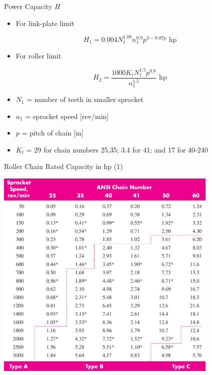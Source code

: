 \documentclass[10pt, svgnames]{beamer}
\begin{document}
\begin{frame}[label={sec:org4d8bb80}]{Power Capacity \(H\)}
\begin{itemize}
\item For link-plate limit
\end{itemize}

$$ H_1 = 0.004 N_1^{1.08} n_1^{0.9} p^{3-0.07p} \text{ hp} $$

\begin{itemize}
\item For roller limit
\end{itemize}

$$ H_2 = \frac{1000 K_t N_1^{1.5} p^{0.8}}{n_1^{1.5}} \text{ hp}$$

\begin{itemize}
\item \(N_1\) = number of teeth in smaller sprocket
\item \(n_1\) = sprocket speed [rev/min]
\item \(p\) = pitch of chain [m]
\item \(K_t\) = 29 for chain numbers 25,35; 3.4 for 41; and 17 for 40-240
\end{itemize}
\end{frame}

\begin{frame}[label={sec:org8ba60ac}]{Roller Chain Rated Capacity in hp (1)}
\begin{center}
\includegraphics[width=0.8\textwidth]{./pictures/chain-rated-capacity.png}
\end{center}
\end{frame}
\end{document}
